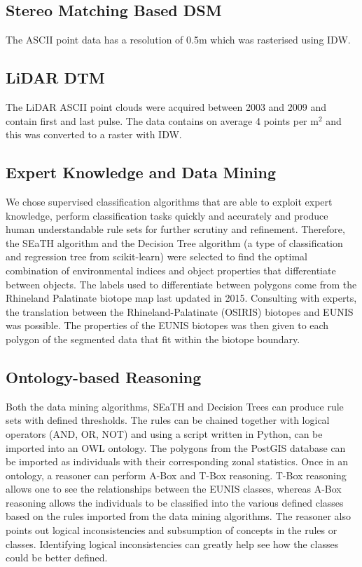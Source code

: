 \documentclass[authoryear, review,12pt,number]{elsarticle}
\begin{document}
\subsection{Stereo Matching Based DSM}
The ASCII point data has a resolution of 0.5m which was rasterised using IDW.
\subsection{LiDAR DTM}
The LiDAR ASCII point clouds were acquired between 2003 and 2009 and contain
first and last pulse. The data contains on average 4 points per m$^{2}$ and
this was converted to a raster with IDW.

\subsection{Expert Knowledge and Data Mining}
We chose supervised classification algorithms that are able to exploit expert
knowledge, perform classification tasks quickly and accurately and produce human
understandable rule sets for further scrutiny and refinement. Therefore, the
SEaTH algorithm and the Decision Tree algorithm (a type of classification and regression
tree from scikit-learn) were selected to find the optimal combination of 
environmental indices and
object properties that differentiate between objects. The labels used to
differentiate between polygons come from the Rhineland Palatinate biotope map
last updated in 2015. Consulting with experts, the translation between the
Rhineland-Palatinate (OSIRIS) biotopes and EUNIS was possible. The properties of
the EUNIS biotopes was then given to each polygon of the segmented data that
fit within the biotope boundary.
\subsection{Ontology-based Reasoning}
Both the data mining algorithms, SEaTH and Decision Trees can produce rule
sets with defined thresholds. The rules can be chained together with logical
operators (AND, OR, NOT) and using a script written in Python, can be imported
into an OWL ontology. The polygons from the PostGIS database can be imported
as individuals with their corresponding zonal statistics. Once in an ontology, a
reasoner can perform A-Box and T-Box reasoning. T-Box reasoning allows one
to see the relationships between the EUNIS classes, whereas A-Box reasoning
allows the individuals to be classified into the various defined classes based
on the rules imported from the data mining algorithms. The reasoner also
points out logical inconsistencies and subsumption of concepts in the rules or
classes. Identifying logical inconsistencies can greatly help see how the 
classes
could be better defined.
\end{document}
